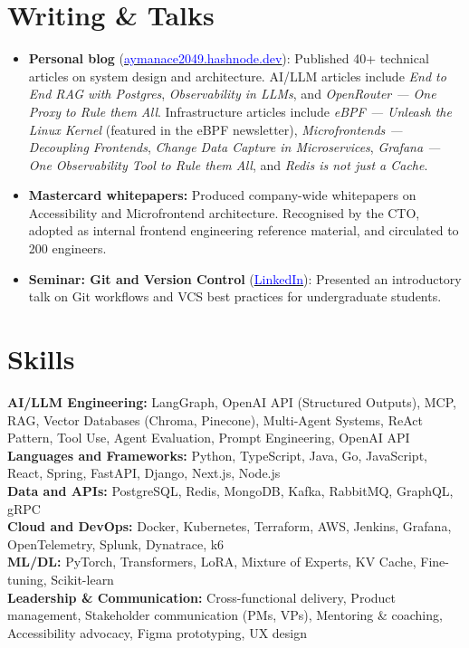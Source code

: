 \documentclass[a4paper,10pt]{article}
\let\oldhref\href
\renewcommand{\href}[2]{\oldhref{#1}{\uline{\textcolor{blue}{#2}}}}
\newcommand{\skill}[2]{
  \textbf{#1:} #2
}
\begin{document}
\section{Writing \& Talks}

\begin{itemize}
  \item \textbf{Personal blog} (\href{https://aymanace2049.hashnode.dev}{aymanace2049.hashnode.dev}): Published 40+ technical articles on system design and architecture. AI/LLM articles include \textit{End to End RAG with Postgres}, \textit{Observability in LLMs}, and \textit{OpenRouter --- One Proxy to Rule them All}. Infrastructure articles include \textit{eBPF --- Unleash the Linux Kernel} (featured in the eBPF newsletter), \textit{Microfrontends --- Decoupling Frontends}, \textit{Change Data Capture in Microservices}, \textit{Grafana --- One Observability Tool to Rule them All}, and \textit{Redis is not just a Cache}.
  \item \textbf{Mastercard whitepapers:} Produced company-wide whitepapers on Accessibility and Microfrontend architecture. Recognised by the CTO, adopted as internal frontend engineering reference material, and circulated to 200 engineers.
  \item \textbf{Seminar: Git and Version Control} \small{(\href{https://www.linkedin.com/posts/aymanapatel_starting-the-year-with-a-presentation-to-share-6618043239972855808-f8Dd/}{LinkedIn})}: Presented an introductory talk on Git workflows and VCS best practices for undergraduate students.
\end{itemize}



\section{Skills}
{\small
\skill{AI/LLM Engineering}{LangGraph, OpenAI API (Structured Outputs), MCP, RAG, Vector Databases (Chroma, Pinecone), Multi-Agent Systems, ReAct Pattern, Tool Use, Agent Evaluation, Prompt Engineering, OpenAI API}\\
\skill{Languages and Frameworks}{Python, TypeScript, Java, Go, JavaScript, React, Spring, FastAPI, Django, Next.js, Node.js}\\
\skill{Data and APIs}{PostgreSQL, Redis, MongoDB, Kafka, RabbitMQ, GraphQL, gRPC}\\
\skill{Cloud and DevOps}{Docker, Kubernetes, Terraform, AWS, Jenkins, Grafana, OpenTelemetry, Splunk, Dynatrace, k6}\\
\skill{ML/DL}{PyTorch, Transformers, LoRA, Mixture of Experts, KV Cache, Fine-tuning, Scikit-learn}\\
\skill{Leadership \& Communication}{Cross-functional delivery, Product management, Stakeholder communication (PMs, VPs), Mentoring \& coaching, Accessibility advocacy, Figma prototyping, UX design}
}
\end{document}
